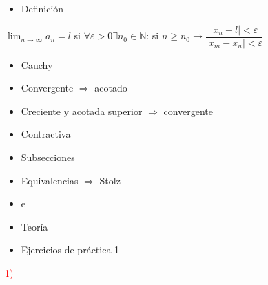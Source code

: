 \documentclass[12pt]{article}
\begin{document}
\begin{itemize}[label=\color{red}\textbullet, leftmargin=*]
	\item \color{lightblue}Definición
\end{itemize}
$\lim_{n\to\infty}a_n=l$ si $\forall\varepsilon>0\exists n_0\in\mathbb{N}$: si $n\ge n_0\rightarrow\dfrac{|x_n-l|<\varepsilon}{|x_m-x_n|<\varepsilon}$
\begin{itemize}[label=$\longrightarrow$]
	\item Cauchy
	\item Convergente $\Rightarrow$ acotado
	\item Creciente y acotada superior $\Rightarrow$ convergente
	\item Contractiva
	\item Subsecciones
	\item Equivalencias $\Rightarrow$ Stolz
	\item {\Large e}
	\item Teoría
\end{itemize}
\begin{itemize}[label=\color{red}\textbullet, leftmargin=*]
	\item \color{lightblue}Ejercicios de práctica 1
\end{itemize}
\textcolor{red}{1)}
\end{document}
